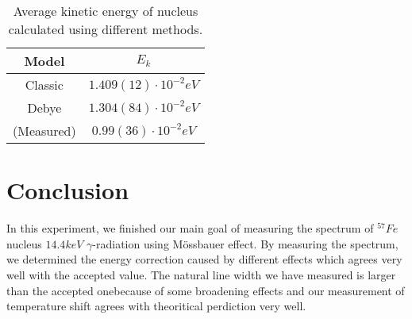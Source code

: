 \documentclass[aps,twocolumn,secnumarabic,balancelastpage,amsmath,amssymb,nofootinbib]{revtex4}
\begin{document}
\begin{table}
  \begin{tabular}{|c|c|}
    \hline
    Model&$E_k$\\\hline
    Classic&$1.409(12)\cdot 10^{-2}eV$\\\hline
    Debye&$1.304(84)\cdot 10^{-2}eV$\\\hline
    (Measured)&$0.99(36)\cdot 10^{-2}eV$\\\hline
  \end{tabular}
  \caption{Average kinetic energy of nucleus calculated using different methods.}
  \label{temp_model}
\end{table}

\section{Conclusion}
In this experiment, we finished our main goal of measuring the spectrum of ${}^{57}Fe$ nucleus $14.4keV$ $\gamma$-radiation using M\"{o}ssbauer effect. By measuring the spectrum, we determined the energy correction caused by different effects which agrees very well with the accepted value. The natural line width we have measured is larger than the accepted onebecause of some broadening effects and our measurement of temperature shift agrees with theoritical perdiction very well.


\end{document}

